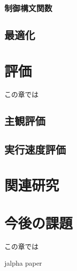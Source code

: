 \documentclass[a4j,12pt]{jreport}
\begin{document}
\subsection{制御構文関数}
\section{最適化}

\chapter{評価}
この章では
\section{主観評価}
\section{実行速度評価}


\chapter{関連研究}


\chapter{今後の課題}
この章では


 {jalpha}
 {paper}
\end{document}
